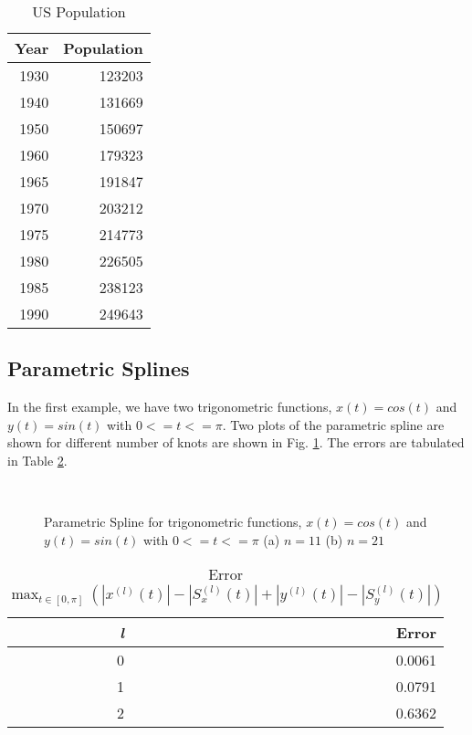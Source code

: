 \documentclass[11pt]{article}
\begin{document}
\begin{table}[htbp]
  \centering
  \caption{US Population}
    \begin{tabular}{rr}
    \toprule
    Year & Population\\
    \midrule
    1930  & 123203 \\
    1940  & 131669 \\
    1950  & 150697 \\
    1960  & 179323 \\
    1965  & 191847 \\
    1970  & 203212 \\
    1975  & 214773 \\
    1980  & 226505 \\
    1985  & 238123 \\
    1990  & 249643 \\
    \bottomrule
    \end{tabular}%
  \label{tab:Pop}%
\end{table}%
%
%
\subsection{Parametric Splines}

In the first example, we have two trigonometric functions, $x(t) = cos(t)$ and  $y(t) = sin(t)$  with $0 <= t <=\pi$. Two plots of the parametric spline are shown for different number of knots are shown in Fig. \ref{fig:trig}. The errors are tabulated in Table \ref{tab:error}.

\begin{figure}
     \centering
    		 \subfloat[][]{ \label{n_11}}\\
		 \subfloat[][]{ \label{n_21}}
     \caption{Parametric Spline for trigonometric functions, $x(t) = cos(t)$ and  $y(t) = sin(t)$  with $0 <= t <=\pi$ (a) $n = 11$ (b) $n = 21$}
     \label{fig:trig}
\end{figure}
%
%
\begin{table}[htbp]
  \centering
  \caption{ Error $\max _{t\in \left[ 0,\pi \right] }\left(  \left| x^{(l)}(t) \right| - \left| S^{(l)}_x (t) \right|   +   \left| y^{(l)}(t) \right| - \left| S^{(l)}_y (t) \right|\right)$ }
    \begin{tabular}{rr}
    \toprule
    \textit{l} & Error\\
    \midrule
    0     & 0.0061 \\
    1     & 0.0791 \\
    2     & 0.6362 \\
    \bottomrule
    \end{tabular}%
  \label{tab:error}%
\end{table}%
\end{document}

